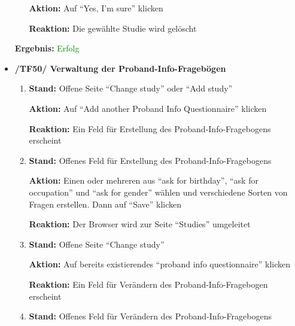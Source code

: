 \documentclass[a4paper]{scrreprt}
\begin{document}
\begin{itemize}
\begin{enumerate}
                              \par \textbf{Aktion: }Auf ``Yes, I'm sure'' klicken
                              \par \textbf{Reaktion: }Die gew\"ahlte Studie wird gel\"oscht                                                                                                  
                    \end{enumerate}
					\vspace*{0.3cm}
		           \par \textbf{Ergebnis: }\textcolor{green}{Erfolg}
		           \vspace*{0.6cm}  
		           
                \item \textbf{/TF50/ Verwaltung der Proband-Info-Frageb\"ogen}
                    \begin{enumerate}
                        \item \par \textbf{Stand: }Offene Seite ``Change study'' oder ``Add study''
                              \par \textbf{Aktion: }Auf ``Add another Proband Info Questionnaire'' klicken
                              \par \textbf{Reaktion: }Ein Feld f\"ur Erstellung des Proband-Info-Fragebogens erscheint
                        \item \par \textbf{Stand: }Offenes Feld f\"ur Erstellung des Proband-Info-Fragebogens
                              \par \textbf{Aktion: }Einen oder mehreren aus ``ask for birthday'', ``ask for occupation'' und ``ask for gender'' w\"ahlen und verschiedene Sorten von Fragen erstellen. Dann auf ``Save'' klicken
                              \par \textbf{Reaktion: }Der Browser wird zur Seite ``Studies'' umgeleitet   
                        \item \par \textbf{Stand: }Offene Seite ``Change study''
                              \par \textbf{Aktion: }Auf bereits existierendes ``proband info questionnaire'' klicken
                              \par \textbf{Reaktion: }Ein Feld f\"ur Ver\"andern des Proband-Info-Fragebogen erscheint  
                        \item \par \textbf{Stand: }Offenes Feld f\"ur Ver\"andern des Proband-Info-Fragebogens

\end{enumerate}
\end{itemize}
\end{document}
